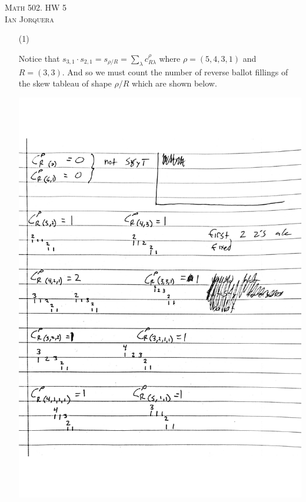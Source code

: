 \documentclass[12pt]{amsart}
\theoremstyle{definition}
\begin{document}
\begin{center}
    \textsc{Math 502. HW 5\\ Ian Jorquera}
\end{center}
\vspace{1em}

\begin{itemize}

\item[(1)] %

Notice that $s_{3,1}\cdot s_{2,1}=s_{\rho/R}=\sum_\lambda c^{\rho}_{R\lambda}$ where $\rho=(5,4,3,1)$ and $R=(3,3)$. And so we must count the number of reverse ballot fillings of the skew tableau of shape $\rho/R$ which are shown below.

\includegraphics[scale=.6]{pics/hw6skew lr.pdf}


\end{itemize}
\end{document}

